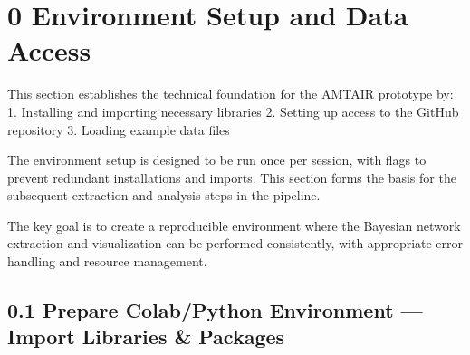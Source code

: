 \documentclass[
  11pt,
  letterpaper,
]{book}
\begin{document}
\chapter{0 Environment Setup and Data
Access}\label{environment-setup-and-data-access}

This section establishes the technical foundation for the AMTAIR
prototype by: 1. Installing and importing necessary libraries 2. Setting
up access to the GitHub repository 3. Loading example data files

The environment setup is designed to be run once per session, with flags
to prevent redundant installations and imports. This section forms the
basis for the subsequent extraction and analysis steps in the pipeline.

The key goal is to create a reproducible environment where the Bayesian
network extraction and visualization can be performed consistently, with
appropriate error handling and resource management.

\section{0.1 Prepare Colab/Python Environment --- Import Libraries \&
Packages}\label{prepare-colabpython-environment-import-libraries-packages}
\end{document}

